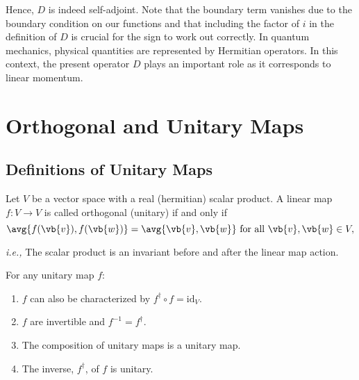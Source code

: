 \documentclass[a4paper,12pt]{report}
\begin{document}
Hence, $D$ is indeed self-adjoint. Note that the boundary term vanishes due to the boundary condition on our functions and that including the factor of $i$ in the definition of $D$ is crucial for the sign to work out correctly. In quantum mechanics, physical quantities are represented by Hermitian operators. In this context, the present operator $D$ plays an important role as it corresponds to linear momentum.

\section{Orthogonal and Unitary Maps}

\subsection{Definitions of Unitary Maps}

\begin{definition}
Let \(V\) be a vector space with a real (hermitian) scalar product. A linear map \(f: V \rightarrow V\) is called orthogonal (unitary) if and only if 
\begin{equation} \label{unitarydef} 
    \avg{f(\vb{v} ), f(\vb{w} )} = \avg{\vb{v} ,\vb{w} } \text{ for all } \vb{v} ,\vb{w} \in V,
\end{equation}

\textit{i.e.,} The scalar product is an invariant before and after the linear map action.
\end{definition}

\begin{lemma}
For any unitary map \(f\):
\begin{enumerate}[label=(\(N\)\arabic*)]
    \item  \(f\) can also be characterized by \(f^{\dagger} \circ f = \mathrm{id}_{V} \).
    \item  \(f\) are invertible and \(f^{-1} = f^{\dagger} \). 
    \item The composition of unitary maps is a unitary map.
    \item The inverse, \(f^{\dagger} \), of \(f\) is unitary.  
\end{enumerate}

\end{lemma}
\end{document}
